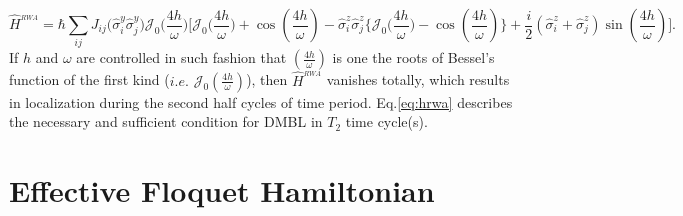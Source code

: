 \documentclass[%
nofootinbib,
reprint,
superscriptaddress,
amsmath,amssymb,showkeys,
aps,
prb,
]{revtex4-2}
\begin{document}
	\begin{equation}
		\hat{H}^{_{RWA}} = \hbar\sum_{ij} J_{ij} \Big(\hat{\sigma}^y_i\hat{\sigma}^y_j\Big) \mathcal{J}_0\Big(\frac{4h}{\omega}\Big)\Bigg[\mathcal{J}_0\Big(\frac{4h}{\omega}\Big) + \cos(\frac{4h}{\omega}) -\hat{\sigma}^z_i\hat{\sigma}^z_j \bigg\{\mathcal{J}_0\Big(\frac{4h}{\omega}\Big) - \cos(\frac{4h}{\omega})\bigg\} + \frac{i}{2} (\hat{\sigma}^z_i + \hat{\sigma}^z_j) \sin(\frac{4h}{\omega})\Bigg].
		\label{eq:hrwa}
	\end{equation}	
	If $h$ and $\omega$ are controlled in such fashion that $\left(\frac{4h}{\omega}\right)$ is one the roots of Bessel's function of the first kind (${i.e.}$ $\mathcal{J}_0\left(\frac{4h}{\omega}\right)$), then $\hat{H}^{_{RWA}}$ vanishes totally, which results in localization during the second half cycles of time period. Eq.\eqref{eq:hrwa} describes the necessary and sufficient condition for DMBL in $T_2$ time cycle(s). 
	
	\section{\label{sec:AppendixB} Effective Floquet Hamiltonian}
	
\end{document}
